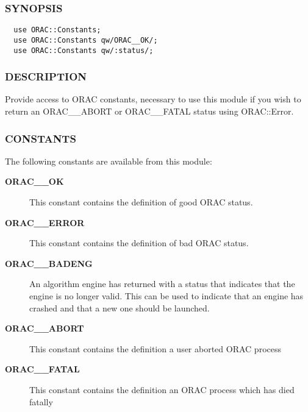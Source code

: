 \subsubsection*{SYNOPSIS\label{ORAC::Constants_SYNOPSIS}}\begin{verbatim}
  use ORAC::Constants;
  use ORAC::Constants qw/ORAC__OK/;
  use ORAC::Constants qw/:status/;
\end{verbatim}
\subsubsection*{DESCRIPTION\label{ORAC::Constants_DESCRIPTION}}

Provide access to ORAC constants, necessary to use this module if you wish
to return an ORAC\_\_ABORT or ORAC\_\_FATAL status using ORAC::Error.

\subsubsection*{CONSTANTS\label{ORAC::Constants_CONSTANTS}}

The following constants are available from this module:

\begin{description}
\item[\textbf{ORAC\_\_OK}] \mbox{}

This constant contains the definition of good ORAC status.

\item[\textbf{ORAC\_\_ERROR}] \mbox{}

This constant contains the definition of bad ORAC status.

\item[\textbf{ORAC\_\_BADENG}] \mbox{}

An algorithm engine has returned with a status that indicates
that the engine is no longer valid. This can be used to
indicate that an engine has crashed and that a new one should be
launched.

\item[\textbf{ORAC\_\_ABORT}] \mbox{}

This constant contains the definition a user aborted ORAC process

\item[\textbf{ORAC\_\_FATAL}] \mbox{}

This constant contains the definition an ORAC process which has died fatally

\end{description}

